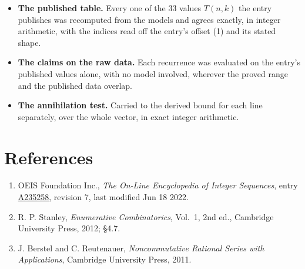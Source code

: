 \documentclass[11pt]{article}
\theoremstyle{definition}
\begin{document}
\begin{itemize}

\item {\bfseries The published table.} Every one of the 33 values $T(n,k)$ the entry publishes was recomputed from the models and agrees exactly, in integer arithmetic, with the indices read off the entry's offset (1) and its stated shape.

\item {\bfseries The claims on the raw data.} Each recurrence was evaluated on the entry's published values alone, with no model involved, wherever the proved range and the published data overlap.

\item {\bfseries The annihilation test.} Carried to the derived bound for each line separately, over the whole vector, in exact integer arithmetic.

\end{itemize}

\section{References}

\begin{enumerate}

\item OEIS Foundation Inc., \emph{The On-Line Encyclopedia of Integer Sequences}, entry \href{https://oeis.org/A235258}{A235258}, revision 7, last modified Jun 18 2022.

\item R. P. Stanley, \emph{Enumerative Combinatorics}, Vol.~1, 2nd ed., Cambridge University Press, 2012; \S4.7.

\item J. Berstel and C. Reutenauer, \emph{Noncommutative Rational Series with Applications}, Cambridge University Press, 2011.

\end{enumerate}
\end{document}
